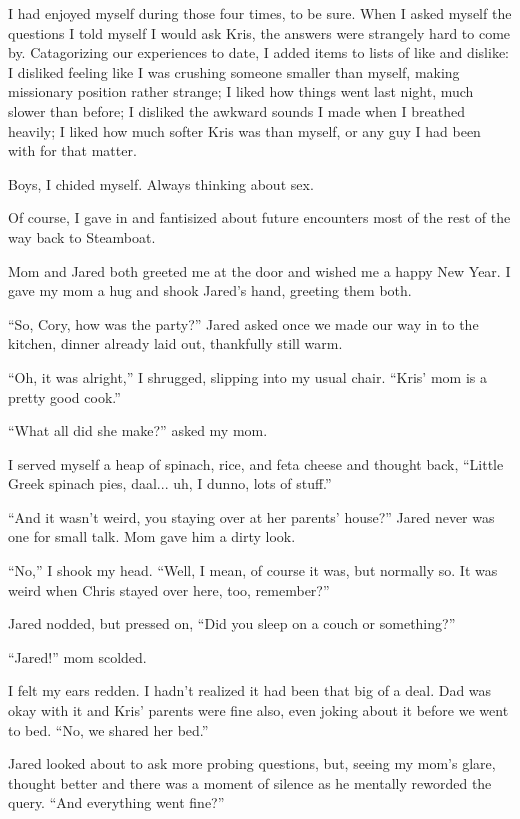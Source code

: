 I had enjoyed myself during those four times, to be sure.  When I asked myself the questions I told myself I would ask Kris, the answers were strangely hard to come by.  Catagorizing our experiences to date, I added items to lists of like and dislike: I disliked feeling like I was crushing someone smaller than myself, making missionary position rather strange; I liked how things went last night, much slower than before; I disliked the awkward sounds I made when I breathed heavily; I liked how much softer Kris was than myself, or any guy I had been with for that matter.

Boys, I chided myself.  Always thinking about sex.

Of course, I gave in and fantisized about future encounters most of the rest of the way back to Steamboat.

Mom and Jared both greeted me at the door and wished me a happy New Year.  I gave my mom a hug and shook Jared's hand, greeting them both.

``So, Cory, how was the party?'' Jared asked once we made our way in to the kitchen, dinner already laid out, thankfully still warm.

``Oh, it was alright,'' I shrugged, slipping into my usual chair.  ``Kris' mom is a pretty good cook.''

``What all did she make?'' asked my mom.

I served myself a heap of spinach, rice, and feta cheese and thought back, ``Little Greek spinach pies, daal... uh, I dunno, lots of stuff.''

``And it wasn't weird, you staying over at her parents' house?''  Jared never was one for small talk.  Mom gave him a dirty look.

``No,'' I shook my head.  ``Well, I mean, of course it was, but normally so.  It was weird when Chris stayed over here, too, remember?''

Jared nodded, but pressed on, ``Did you sleep on a couch or something?''

``Jared!'' mom scolded.

I felt my ears redden.  I hadn't realized it had been that big of a deal.  Dad was okay with it and Kris' parents were fine also, even joking about it before we went to bed.  ``No, we shared her bed.''

Jared looked about to ask more probing questions, but, seeing my mom's glare, thought better and there was a moment of silence as he mentally reworded the query.  ``And everything went fine?''

